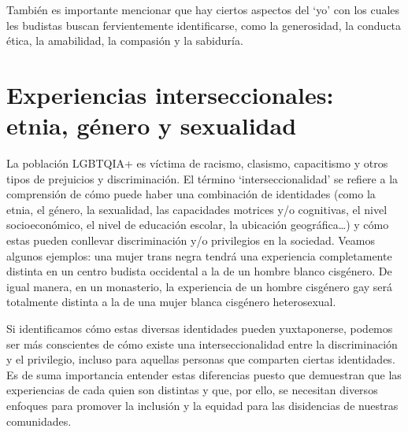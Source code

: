 \documentclass[12pt,openany]{book}
\begin{document}
También es importante mencionar que hay ciertos aspectos del `yo' con los cuales les budistas buscan fervientemente identificarse, como la generosidad, la conducta ética, la amabilidad, la compasión y la sabiduría.

\section*{Experiencias interseccionales: etnia, género y sexualidad}

La población LGBTQIA+ es víctima de racismo, clasismo, capacitismo y otros tipos de prejuicios y discriminación. El término `interseccionalidad' se refiere a la comprensión de cómo puede haber una combinación de identidades (como la etnia, el género, la sexualidad, las capacidades motrices y/o cognitivas, el nivel socioeconómico, el nivel de educación escolar, la ubicación geográfica…) y cómo estas pueden conllevar discriminación y/o privilegios en la sociedad. Veamos algunos ejemplos: una mujer trans negra tendrá una experiencia completamente distinta en un centro budista occidental a la de un hombre blanco cisgénero. De igual manera, en un monasterio, la experiencia de un hombre cisgénero gay será totalmente distinta a la de una mujer blanca cisgénero heterosexual.

Si identificamos cómo estas diversas identidades pueden yuxtaponerse, podemos ser más conscientes de cómo existe una interseccionalidad entre la discriminación y el privilegio, incluso para aquellas personas que comparten ciertas identidades. Es de suma importancia entender estas diferencias puesto que demuestran que las experiencias de cada quien son distintas y que, por ello, se necesitan diversos enfoques para promover la inclusión y la equidad para las disidencias de nuestras comunidades.

\begin{figure}[h]
    \centering
\end{figure}
\end{document}
